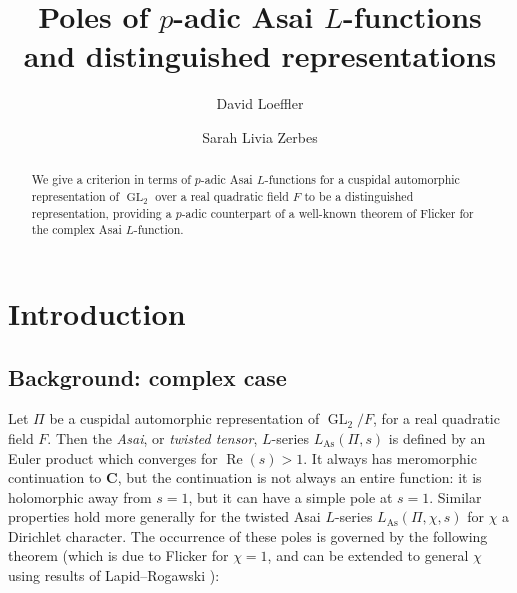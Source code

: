 \documentclass[a4paper,10pt]{amsart}
\author{David Loeffler}
\author{Sarah Livia Zerbes}
\title{Poles of $p$-adic Asai $L$-functions and distinguished representations}
\theoremstyle{plain}
\theoremstyle{remark}
\DeclareMathOperator{\GL}{GL}
\DeclareMathOperator{\As}{As}
\newcommand{\CC}{\mathbf{C}}
\numberwithin{equation}{section}
\begin{document}
 \renewcommand{\crefrangeconjunction}{--} %

 \begin{abstract}
  We give a criterion in terms of $p$-adic Asai $L$-functions for a cuspidal automorphic representation of $\GL_2$ over a real quadratic field $F$ to be a distinguished representation, providing a $p$-adic counterpart of a well-known theorem of Flicker for the complex Asai $L$-function.
 \end{abstract}



 \maketitle



\section{Introduction}

 \subsection{Background: complex case}

  Let $\Pi$ be a cuspidal automorphic representation of $\GL_2 / F$, for a real quadratic field $F$. Then the \emph{Asai}, or \emph{twisted tensor}, $L$-series $L_{\As}(\Pi, s)$ is defined by an Euler product which converges for $\operatorname{Re}(s) > 1$. It always has meromorphic continuation to $\CC$, but the continuation is not always an entire function: it is holomorphic away from $s = 1$, but it can have a simple pole at $s = 1$. Similar properties hold more generally for the twisted Asai $L$-series $L_{\As}(\Pi, \chi, s)$ for $\chi$ a Dirichlet character. The occurrence of these poles is governed by the following theorem (which is due to Flicker \cite{flicker88} for $\chi = 1$, and can be extended to general $\chi$ using results of Lapid--Rogawski \cite{lapidrogawski98}):
\end{document}

